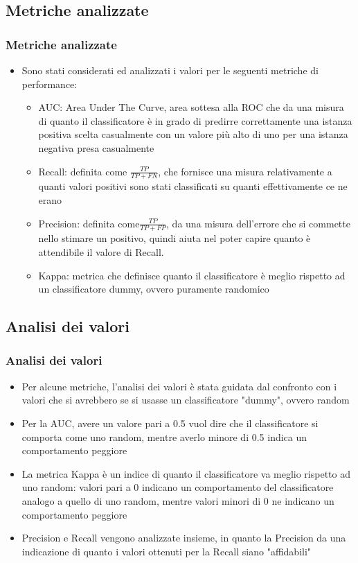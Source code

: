 \documentclass[10pt]{beamer}
\begin{document}
\begin{frame}
\section{Metriche analizzate}
\frametitle{Metriche analizzate}
\begin{itemize}
\item Sono stati considerati ed analizzati i valori per le seguenti metriche di performance:
\begin{itemize}
\item AUC: Area Under The Curve, area sottesa alla ROC che da una misura di quanto il classificatore è in grado di predirre correttamente una istanza positiva scelta casualmente con un valore più alto di uno per una istanza negativa presa casualmente
\item Recall: definita come $\frac{TP}{TP+FN}$, che fornisce una misura relativamente a quanti valori positivi sono stati classificati su quanti effettivamente ce ne erano
\item Precision: definita come$\frac{TP}{TP+FP}$, da una misura dell'errore che si commette nello stimare un positivo, quindi aiuta nel poter capire quanto è attendibile il valore di Recall.
\item Kappa: metrica che definisce quanto il classificatore è meglio rispetto ad un classificatore dummy, ovvero puramente randomico
\end{itemize}
\end{itemize} 
\end{frame}

\begin{frame}
\subsection{Analisi dei valori}
\frametitle{Analisi dei valori}
\begin{itemize}
\item Per alcune metriche, l'analisi dei valori è stata guidata dal confronto con i valori che si avrebbero se si usasse un classificatore "dummy", ovvero random
\item Per la AUC, avere un valore pari a 0.5 vuol dire che il classificatore si comporta come uno random, mentre averlo minore di 0.5 indica un comportamento peggiore
\item La metrica Kappa è un indice di quanto il classificatore va meglio rispetto ad uno random: valori pari a 0 indicano un comportamento del classificatore analogo a quello di uno random, mentre valori minori di 0 ne indicano un comportamento peggiore
\item Precision e Recall vengono analizzate insieme, in quanto la Precision da una indicazione di quanto i valori ottenuti per la Recall siano "affidabili"
\end{itemize} 
\end{frame}
\end{document}

